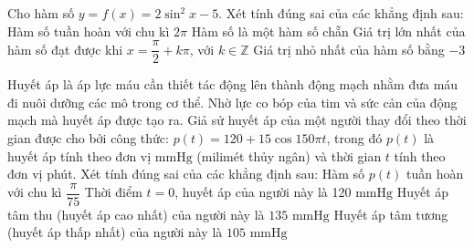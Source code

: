 \begin{ex}
	Cho hàm số $y=f(x)=2\sin^2x-5$. Xét tính đúng sai của các khẳng định sau:
	\choiceTF
	{Hàm số tuần hoàn với chu kì $2\pi$}
	{\True Hàm số là một hàm số chẵn}
	{\True Giá trị lớn nhất của hàm số đạt được khi $x=\dfrac{\pi}{2}+k\pi$, với $k \in \mathbb{Z}$}
	{Giá trị nhỏ nhất của hàm số bằng $-3$}
\end{ex}

\begin{ex}%
	Huyết áp là áp lực máu cần thiết tác động lên thành động mạch nhằm đưa máu đi nuôi dưỡng các mô trong cơ thể. Nhờ lực co bóp của tim và sức cản của động mạch mà huyết áp được tạo ra. Giả sử huyết áp của một người thay đổi theo thời gian được cho bởi công thức:
	$p\left(t\right)=120+15\cos 150\pi t$,
	trong đó $p\left(t\right)$ là huyết áp tính theo đơn vị $\mathrm{mmHg}$ (milimét thủy ngân) và thời gian $t$ tính theo đơn vị phút.  Xét tính đúng sai của các khẳng định sau:
	\choiceTF
	{Hàm số $p(t)$ tuần hoàn với chu kì $\dfrac{\pi}{75}$}
	{Thời điểm $t=0$, huyết áp của người này là 120 $\mathrm{mmHg}$}
	{\True Huyết áp tâm thu (huyết áp cao nhất) của người này là $135$ $\mathrm{mmHg}$}
	{\True Huyết áp tâm tương (huyết áp thấp nhất) của người này là $105$ $\mathrm{mmHg}$}
\end{ex}

